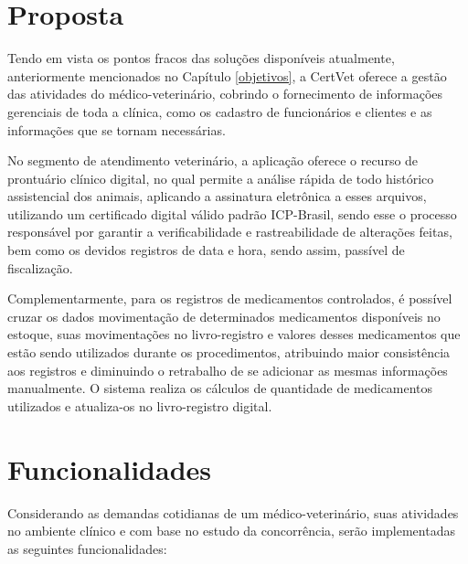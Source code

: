 \documentclass[
    12pt,               %
    openright,          %
    oneside,
    a4paper,            %
    BIBLATEX,           %
    TODO,               %
    english,            %
    brazil              %
    ]{ifsp-spo-inf-ctds}
\begin{document}
    \section{Proposta}
    
        Tendo em vista os pontos fracos das soluções disponíveis atualmente, anteriormente mencionados no Capítulo \ref{objetivos}, a CertVet oferece a gestão das atividades do médico-veterinário, cobrindo o fornecimento de informações gerenciais de toda a clínica, como os cadastro de funcionários e clientes e as informações que se tornam necessárias. 

        No segmento de atendimento veterinário, a aplicação oferece o recurso de prontuário clínico digital, no qual permite a análise rápida de todo histórico assistencial dos animais, aplicando a assinatura eletrônica a esses arquivos, utilizando um certificado digital válido padrão ICP-Brasil, sendo esse o processo responsável por garantir a verificabilidade e rastreabilidade de alterações feitas, bem como os devidos registros de data e hora, sendo assim, passível de fiscalização.
        
        Complementarmente, para os registros de medicamentos controlados, é possível cruzar os dados movimentação de determinados medicamentos disponíveis no estoque, suas movimentações no livro-registro e valores desses medicamentos que estão sendo utilizados durante os procedimentos, atribuindo maior consistência aos registros e diminuindo o retrabalho de se adicionar as mesmas informações manualmente. O sistema realiza os cálculos de quantidade de medicamentos utilizados e atualiza-os no livro-registro digital.


    \section{Funcionalidades}
    \label{cap:funcionalidades}
    
        Considerando as demandas cotidianas de um médico-veterinário, suas atividades no ambiente clínico e com base no estudo da concorrência, serão implementadas as seguintes funcionalidades:
\end{document}
